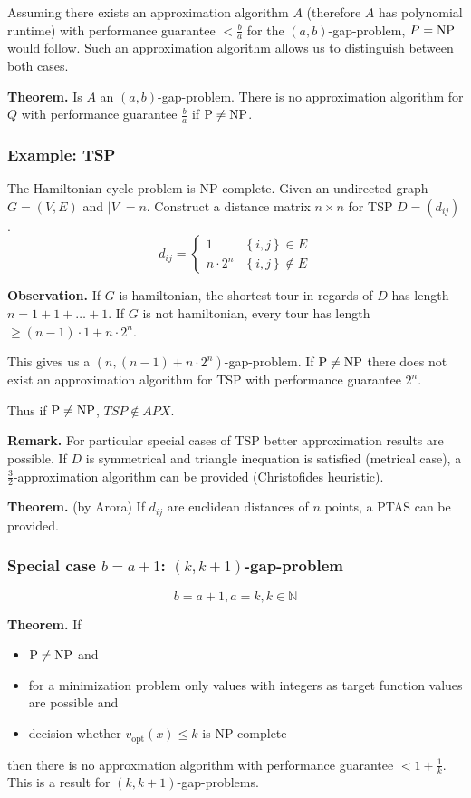 \documentclass[a4paper]{article}
\newcommand{\cls}[1]{\rm{#1}}
\newcommand{\set}[1]{\left\{#1\right\}}
\begin{document}
Assuming there exists an approximation algorithm $A$ (therefore $A$ has
polynomial runtime) with performance guarantee $< \frac{b}{a}$ for the
$(a, b)$-gap-problem, $P = \cls{NP}$ would follow. Such an approximation algorithm
allows us to distinguish between both cases.

\textbf{Theorem.}
Is $A$ an $(a, b)$-gap-problem. There is no approximation algorithm for $Q$
with performance guarantee $\frac{b}{a}$ if $\cls{P} \neq \cls{NP}$.

\subsubsection{Example: TSP}
%
The Hamiltonian cycle problem is \cls{NP}-complete. Given an undirected graph
$G = (V, E)$ and $|V| = n$. Construct a distance matrix $n\times n$ for TSP
$D = (d_{ij})$.
\[
  d_{ij} = \begin{cases}
    1 & \set{i,j} \in E \\
    n\cdot2^n & \set{i,j} \notin E
  \end{cases}
\]

\textbf{Observation.}
  If $G$ is hamiltonian, the shortest tour in regards of $D$ has length
  $n = 1 + 1 + \ldots + 1$. If $G$ is not hamiltonian, every tour has length
  $\geq (n-1)\cdot 1 + n \cdot 2^n$.

This gives us a $(n, (n-1) + n\cdot 2^n)$-gap-problem.
If $\cls{P} \neq \cls{NP}$ there does not exist an approximation algorithm for TSP
with performance guarantee $2^n$.

Thus if $\cls{P} \neq \cls{NP}$, $TSP \notin APX$.

\textbf{Remark.}
  For particular special cases of TSP better approximation results are
  possible. If $D$ is symmetrical and triangle inequation is satisfied
  (metrical case), a $\frac32$-approximation algorithm can be provided
  (Christofides heuristic).

\textbf{Theorem.} (by Arora)
  If $d_{ij}$ are euclidean distances of $n$ points, a PTAS can be provided.

\subsubsection{Special case $b = a + 1$: $(k, k+1)$-gap-problem}
%
\[
  b = a + 1, a = k, k \in \mathbb{N}
\]

\textbf{Theorem.} If
\begin{itemize}
  \item $\cls{P} \neq \cls{NP}$ and
  \item for a minimization problem only values with integers as
        target function values are possible and
  \item decision whether $v_{\text{opt}}(x) \leq k$
        is \cls{NP}-complete
\end{itemize}
then there is no approxmation algorithm with performance guarantee
$< 1 + \frac1{k}$. This is a result for $(k, k+1)$-gap-problems.
\end{document}
